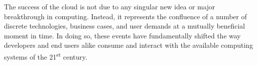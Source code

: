 The success of the cloud is not due to any singular new idea or
major breakthrough in computing. Instead, it represents the confluence
of a number of discrete technologies, business cases, and user demands
at a mutually beneficial moment in time. In doing so, these events
have fundamentally shifted the way developers and end users alike
consume and interact with the available computing systems of the
21\textsuperscript{st} century.

